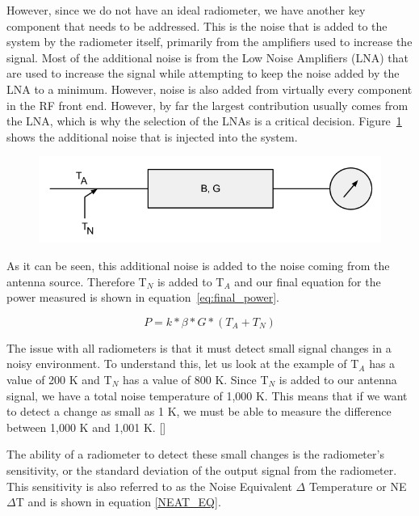 However, since we do not have an ideal radiometer, we have another key component that needs to be addressed.  This is the noise that is added to the system by the radiometer itself, primarily from the amplifiers used to increase the signal.  Most of the additional noise is from the Low Noise Amplifiers (LNA) that are used to increase the signal while attempting to keep the noise added by the LNA to a minimum.  However, noise is also added from virtually every component in the RF front end.  However, by far the largest contribution usually comes from the LNA, which is why the selection of the LNAs is a critical decision.  Figure~\ref{noiserad} shows the additional noise that is injected into the system.

{\begin{figure}[h!tb] 
\centering
\includegraphics[width=\textwidth]{Images/radiometer_noise_added.png}
\label{noiserad}
\end{figure}
}

As it can be seen, this additional noise is added to the noise coming from the antenna source.  Therefore T$_{N}$ is added to T$_{A}$ and our final equation for the power measured is shown in equation~\ref{eq:final_power}.  

\begin{equation} \label{eq:final_power}
P=k*\beta*G*(T_{A}+T_{N})
\end{equation}

The issue with all radiometers is that it must detect small signal changes in a noisy environment.  To understand this, let us look at the example of T$_{A}$ has a value of 200 K and T$_{N}$ has a value of 800 K.  Since T$_{N}$ is added to our antenna signal, we have a total noise temperature of 1,000 K.  This means that if we want to detect a change as small as 1 K, we must be able to measure the difference between 1,000 K and 1,001 K. [\cite{skou}]

The ability of a radiometer to detect these small changes is the radiometer's sensitivity, or the standard deviation of the output signal from the radiometer.  This sensitivity is also referred to as the Noise Equivalent $\Delta$ Temperature or NE$\Delta$T and is shown in equation \ref{NEAT_EQ}. 

